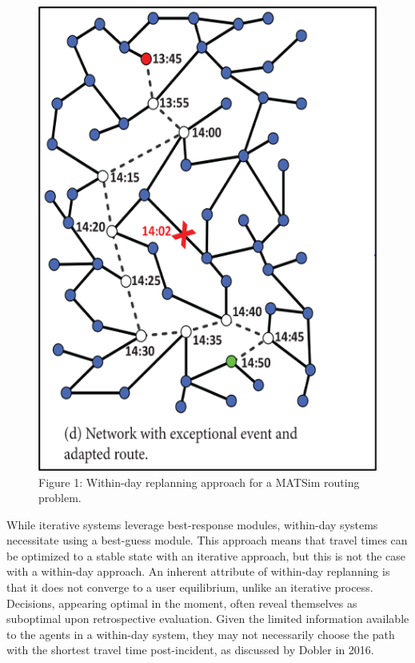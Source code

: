 \documentclass[fancy, oneside, mastersfancy, ms]{byuthesis}
\begin{document}
\begin{figure}

{\centering \includegraphics{figures/fig1.png}

}

\caption{Figure 1: Within-day replanning approach for a MATSim routing
problem.}

\end{figure}

While iterative systems leverage best-response modules, within-day
systems necessitate using a best-guess module. This approach means that
travel times can be optimized to a stable state with an iterative
approach, but this is not the case with a within-day approach. An
inherent attribute of within-day replanning is that it does not converge
to a user equilibrium, unlike an iterative process. Decisions, appearing
optimal in the moment, often reveal themselves as suboptimal upon
retrospective evaluation. Given the limited information available to the
agents in a within-day system, they may not necessarily choose the path
with the shortest travel time post-incident, as discussed by Dobler in
2016.
\end{document}
